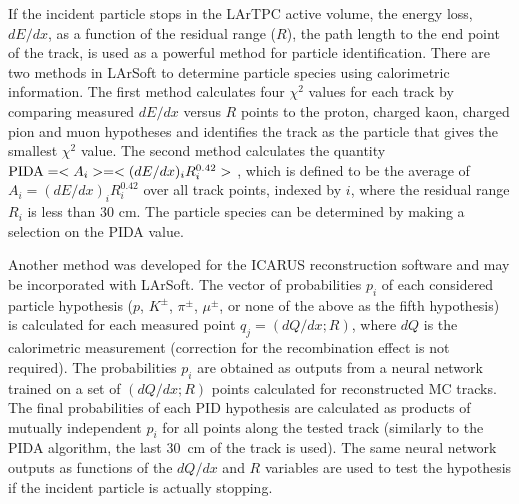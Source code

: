 If the incident particle stops in the LArTPC active volume, the energy
loss, $dE/dx$, as a function of the residual range ($R$), the path
length to the end point of the track, is used as a powerful method for
particle identification. There are two methods in LArSoft to determine
particle species using calorimetric information. The first method
calculates four $\chi^{2}$ values for each track by comparing measured
$dE/dx$ versus $R$ points to the proton, charged kaon, charged pion
and muon hypotheses and identifies the track as the particle that
gives the smallest $\chi^{2}$ value. The second method calculates the
quantity ${\rm{PIDA}} = <A_{i}> = <(dE/dx)_{i}R_{i}^{0.42}>$ \cite{Thomas:1987zz},
which is defined to be the average of $A_{i} =
(dE/dx)_{i}R_{i}^{0.42}$ over all track points, indexed by $i$, where the residual
range $R_{i}$ is less than 30 cm. The particle species can be
determined by making a selection on the PIDA value.

Another method was developed for the ICARUS reconstruction software
and may be incorporated with LArSoft. The vector of probabilities $p_i$
of each considered particle hypothesis ($p$, $K^\pm$, $\pi^\pm$, $\mu^\pm$,
or none of the above as the fifth hypothesis) is calculated for each
measured point $q_j = (dQ/dx; R)$, where $dQ$ is the calorimetric
measurement (correction for the recombination effect is not
required). The probabilities $p_i$ are obtained as outputs from a neural
network trained on a set of $(dQ/dx; R)$ points calculated for
reconstructed MC tracks. The final probabilities of each PID
hypothesis are calculated as products of mutually independent $p_i$ for
all points along the tested track (similarly to the PIDA algorithm, the last 30~cm
of the track is used). The same neural network outputs as functions of the
$dQ/dx$ and $R$ variables are used to test the hypothesis if the incident
particle is actually stopping.

